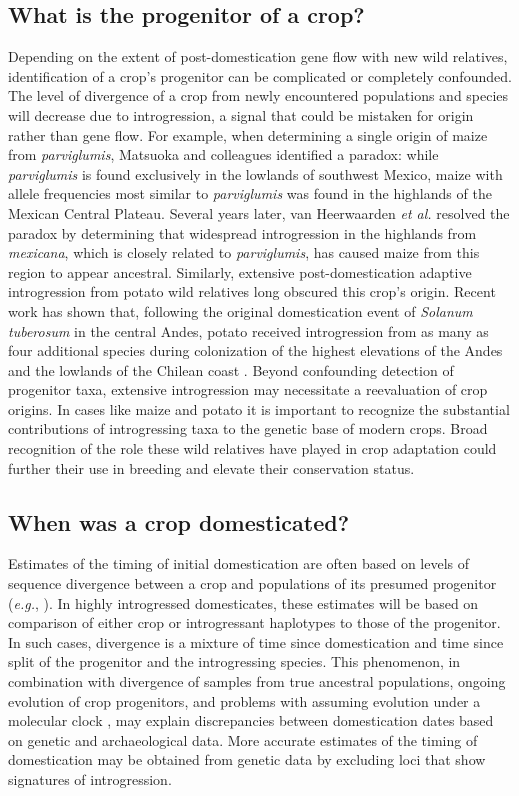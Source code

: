 \documentclass[11pt]{article}
\begin{document}
\subsection*{What is the progenitor of a crop?}
Depending on the extent of post-domestication gene flow with new wild relatives, identification of a crop's progenitor can be complicated or completely confounded.
The level of divergence of a crop from newly encountered populations and species will decrease due to introgression, a signal that could be mistaken for origin rather than gene flow.
For example, when determining a single origin of maize from \emph{parviglumis}, Matsuoka and colleagues \cite{matsuoka2002single} identified a paradox: while \emph{parviglumis} is found exclusively in the lowlands of southwest Mexico, maize with allele frequencies most similar to \emph{parviglumis} was found in the highlands of the Mexican Central Plateau.
Several years later, van Heerwaarden \emph{et al.} \cite{vanHeerwaarden2011} resolved the paradox by determining that widespread introgression in the highlands from \emph{mexicana}, which is closely related to \emph{parviglumis}, has caused maize from this region to appear ancestral.
Similarly, extensive post-domestication adaptive introgression from  potato wild relatives long obscured this crop's origin.
Recent work has shown that, following the original domestication event of \emph{Solanum tuberosum} in the central Andes, potato received introgression from as many as four additional species during colonization of the highest elevations of the Andes and the lowlands of the Chilean coast \cite{Spooner2014, Gavrilenko2013}.
Beyond confounding detection of progenitor taxa, extensive introgression may necessitate a reevaluation of crop origins.
In cases like maize and potato it is important to recognize the substantial contributions of introgressing taxa to the genetic base of modern crops.
Broad recognition of the role these wild relatives have played in crop adaptation could further their use in breeding and elevate their conservation status.

\subsection*{When was a crop domesticated?}
Estimates of the timing of initial domestication are often based on levels of sequence divergence between a crop and populations of its presumed progenitor (\emph{e.g.}, \cite{matsuoka2002single, molina2011molecular}).
In highly introgressed domesticates, these estimates will be based on comparison of either crop or introgressant haplotypes to those of the progenitor.
In such cases, divergence is a mixture of time since domestication and time since split of the progenitor and the introgressing species.
This phenomenon, in combination with divergence of samples from true ancestral populations, ongoing evolution of crop progenitors, and problems with assuming evolution under a molecular clock \cite{Zeder2006}, may explain discrepancies between domestication dates based on genetic and archaeological data.
More accurate estimates of the timing of domestication may be obtained from genetic data by excluding loci that show signatures of introgression.
\end{document}
